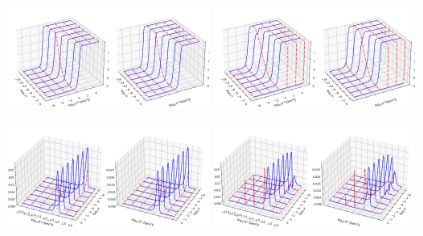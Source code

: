 \documentclass[12pt]{article}
\begin{document}
\begin{figure}
\includegraphics[width=0.475\textwidth]{./dipole-GBW.png}
\includegraphics[width=0.475\textwidth]{./dipole-BGK.png}
\end{figure}
\begin{figure}
\includegraphics[width=0.475\textwidth]{./gluon-GBW.png}
\includegraphics[width=0.475\textwidth]{./gluon-BGK.png}
\end{figure}
\end{document}
